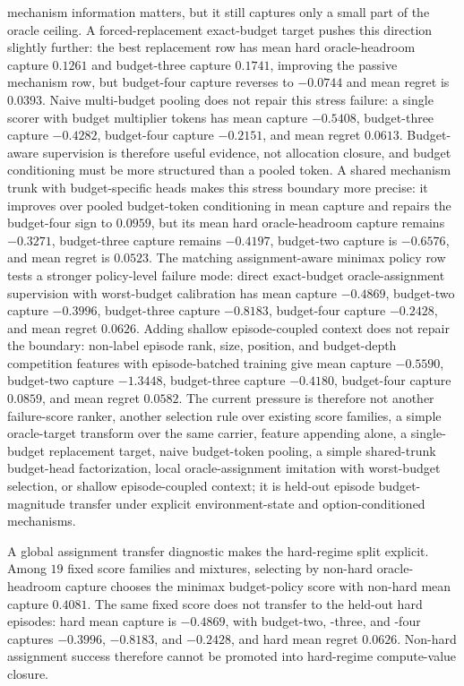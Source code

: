 mechanism information matters, but it still captures only a small part of the
oracle ceiling.  A forced-replacement exact-budget target pushes this direction
slightly further: the best replacement row has mean hard oracle-headroom
capture $0.1261$ and budget-three capture $0.1741$, improving the passive
mechanism row, but budget-four capture reverses to $-0.0744$ and mean regret is
$0.0393$.  Naive multi-budget pooling does not repair this stress failure: a
single scorer with budget multiplier tokens has mean capture $-0.5408$,
budget-three capture $-0.4282$, budget-four capture $-0.2151$, and mean regret
$0.0613$.  Budget-aware supervision is therefore useful evidence, not
allocation closure, and budget conditioning must be more structured than a
pooled token.  A shared mechanism trunk with budget-specific heads makes this
stress boundary more precise: it improves over pooled budget-token conditioning
in mean capture and repairs the budget-four sign to $0.0959$, but its mean
hard oracle-headroom capture remains $-0.3271$, budget-three capture remains
$-0.4197$, budget-two capture is $-0.6576$, and mean regret is $0.0523$.  The
matching assignment-aware minimax policy row tests a stronger policy-level
failure mode: direct exact-budget oracle-assignment supervision with
worst-budget calibration has mean capture $-0.4869$, budget-two capture
$-0.3996$, budget-three capture $-0.8183$, budget-four capture $-0.2428$, and
mean regret $0.0626$.  Adding shallow episode-coupled context does not repair
the boundary: non-label episode rank, size, position, and budget-depth
competition features with episode-batched training give mean capture $-0.5590$,
budget-two capture $-1.3448$, budget-three capture $-0.4180$, budget-four
capture $0.0859$, and mean regret $0.0582$.  The current pressure is therefore
not another failure-score ranker, another selection rule over existing score
families, a simple oracle-target transform over the same carrier, feature
appending alone, a single-budget replacement target, naive budget-token pooling,
a simple shared-trunk budget-head factorization, local oracle-assignment
imitation with worst-budget selection, or shallow episode-coupled context; it
is held-out episode budget-magnitude transfer under explicit environment-state
and option-conditioned mechanisms.

A global assignment transfer diagnostic makes the hard-regime split explicit.
Among $19$ fixed score families and mixtures, selecting by non-hard
oracle-headroom capture chooses the minimax budget-policy score with non-hard
mean capture $0.4081$.  The same fixed score does not transfer to the held-out
hard episodes: hard mean capture is $-0.4869$, with budget-two, -three, and
-four captures $-0.3996$, $-0.8183$, and $-0.2428$, and hard mean regret
$0.0626$.  Non-hard assignment success therefore cannot be promoted into
hard-regime compute-value closure.


